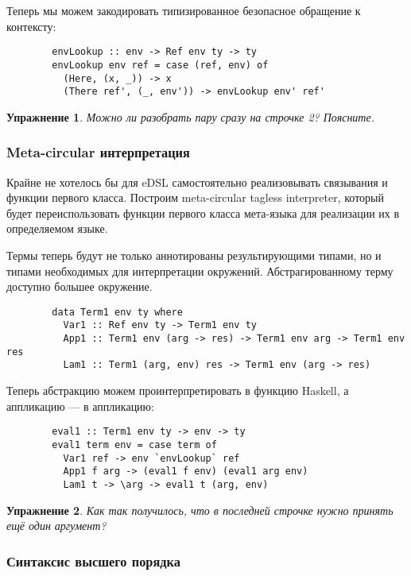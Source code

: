 \documentclass[12pt]{article}
\newtheorem{task}{Упражнение}
\begin{document}
    Теперь мы можем закодировать типизированное безопасное обращение к контексту:
    \begin{verbatim}
        envLookup :: env -> Ref env ty -> ty
        envLookup env ref = case (ref, env) of
          (Here, (x, _)) -> x
          (There ref', (_, env')) -> envLookup env' ref'
    \end{verbatim}

    \begin{task}
        Можно ли разобрать пару сразу на строчке 2?
        Поясните.
    \end{task}

    \subsubsection{Meta-circular интерпретация}

    Крайне не хотелось бы для eDSL самостоятельно реализовывать связывания и функции первого класса.
    Построим meta-circular tagless interpreter, который будет переиспользовать функции первого класса мета-языка для реализации их в определяемом языке.

    Термы теперь будут не только аннотированы результирующими типами, но и типами необходимых для интерпретации окружений.
    Абстрагированному терму доступно большее окружение.

    \begin{verbatim}
        data Term1 env ty where
          Var1 :: Ref env ty -> Term1 env ty
          App1 :: Term1 env (arg -> res) -> Term1 env arg -> Term1 env res
          Lam1 :: Term1 (arg, env) res -> Term1 env (arg -> res)
    \end{verbatim}

    Теперь абстракцию можем проинтерпретировать в функцию Haskell, а аппликацию --- в аппликацию:
    \begin{verbatim}
        eval1 :: Term1 env ty -> env -> ty
        eval1 term env = case term of
          Var1 ref -> env `envLookup` ref
          App1 f arg -> (eval1 f env) (eval1 arg env)
          Lam1 t -> \arg -> eval1 t (arg, env)
    \end{verbatim}

    \begin{task}
        Как так получилось, что в последней строчке нужно принять ещё один аргумент?
    \end{task}

    \subsubsection{Синтаксис высшего порядка}
\end{document}
